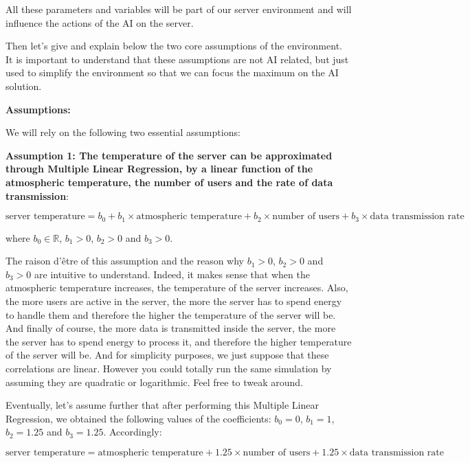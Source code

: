 \documentclass[]{book}
\begin{document}
All these parameters and variables will be part of our server environment and will influence the actions of the AI on the server.

Then let's give and explain below the two core assumptions of the environment. It is important to understand that these assumptions are not AI related, but just used to simplify the environment so that we can focus the maximum on the AI solution.

\textbf{Assumptions:}

We will rely on the following two essential assumptions:

\textbf{Assumption 1: The temperature of the server can be approximated through Multiple Linear Regression, by a linear function of the atmospheric temperature, the number of users and the rate of data transmission}:

\begin{equation*}
    \textrm{server temperature} = b_0 + b_1 \times \textrm{atmospheric temperature} + b_2 \times \textrm{number of users} + b_3 \times \textrm{data transmission rate} 
\end{equation*}

where \(b_0 \in \mathbb{R}\), \(b_1>0\), \(b_2>0\) and \(b_3>0\).

The raison d'être of this assumption and the reason why \(b_1>0\), \(b_2>0\) and \(b_3>0\) are intuitive to understand. Indeed, it makes sense that when the atmospheric temperature increases, the temperature of the server increases. Also, the more users are active in the server, the more the server has to spend energy to handle them and therefore the higher the temperature of the server will be. And finally of course, the more data is transmitted inside the server, the more the server has to spend energy to process it, and therefore the higher temperature of the server will be. And for simplicity purposes, we just suppose that these correlations are linear. However you could totally run the same simulation by assuming they are quadratic or logarithmic. Feel free to tweak around.

Eventually, let's assume further that after performing this Multiple Linear Regression, we obtained the following values of the coefficients: \(b_0 = 0\), \(b_1 = 1\), \(b_2 = 1.25\) and \(b_3 = 1.25\). Accordingly:

\begin{equation*}
    \textrm{server temperature} = \textrm{atmospheric temperature} + 1.25 \times \textrm{number of users} + 1.25 \times \textrm{data transmission rate}
\end{equation*}
\end{document}
